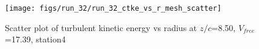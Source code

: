 \begin{figure}[H]
\centering
\texttt{[image: figs/run\_32/run\_32\_ctke\_vs\_r\_mesh\_scatter]}
\caption{Scatter plot of turbulent kinetic energy vs radius at $z/c$=8.50, $V_{free}$=17.39, station4}
\label{fig:run_32_ctke_vs_r_mesh_scatter}
\end{figure}


